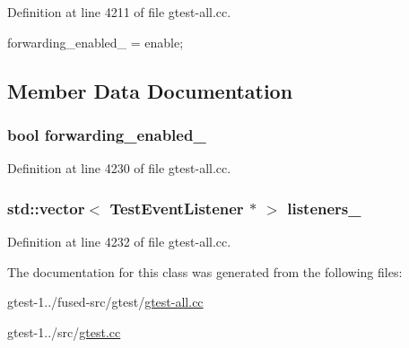 \-Definition at line 4211 of file gtest-\/all.\-cc.


\begin{DoxyCode}
{ forwarding_enabled_ = enable; }
\end{DoxyCode}


\subsection{\-Member \-Data \-Documentation}
\hypertarget{classtesting_1_1internal_1_1TestEventRepeater_a61be6f7c2025bac9b4fc5cd7f8aaa7df}{
\subsubsection[{forwarding\-\_\-enabled\-\_\-}]{\setlength{\rightskip}{0pt plus 5cm}bool {\bf forwarding\-\_\-enabled\-\_\-}}}\label{d9/df1/classtesting_1_1internal_1_1TestEventRepeater_a61be6f7c2025bac9b4fc5cd7f8aaa7df}


\-Definition at line 4230 of file gtest-\/all.\-cc.

\hypertarget{classtesting_1_1internal_1_1TestEventRepeater_af15086bf8d291f76ed23d88ce4578270}{
\subsubsection[{listeners\-\_\-}]{\setlength{\rightskip}{0pt plus 5cm}std\-::vector$<$ {\bf \-Test\-Event\-Listener} $\ast$ $>$ {\bf listeners\-\_\-}}}\label{d9/df1/classtesting_1_1internal_1_1TestEventRepeater_af15086bf8d291f76ed23d88ce4578270}


\-Definition at line 4232 of file gtest-\/all.\-cc.



\-The documentation for this class was generated from the following files\-:\begin{DoxyCompactItemize}
\item 
gtest-\/1../fused-\/src/gtest/\hyperlink{fused-src_2gtest_2gtest-all_8cc}{gtest-\/all.\-cc}\item 
gtest-\/1../src/\hyperlink{gtest_8cc}{gtest.\-cc}\end{DoxyCompactItemize}
